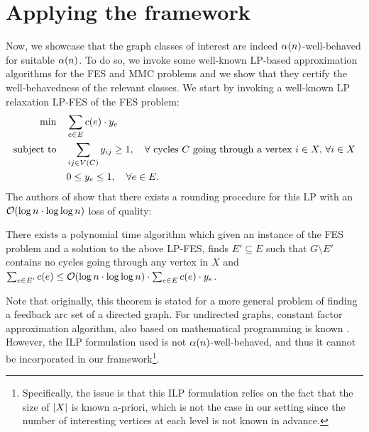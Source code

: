 \section{Applying the framework}\label{sec:applying-framework}

Now, we showcase that the graph classes of interest are indeed $\alpha\mathopen{}\left( n \right)$-well-behaved for suitable $\alpha\mathopen{}\left( n \right)$. To do so, we invoke some well-known LP-based approximation algorithms for the \textsc{FES} and \textsc{MMC} problems and we show that they certify the well-behavedness of the relevant classes. 
We start by invoking a well-known \textsc{LP} relaxation \textsc{LP-FES} of the \textsc{FES} problem:
    \begin{align}
        \min \quad &\sum_{e\in E} c\mathopen{}\left( e \right) \cdot y_{e}\\
        \text{subject to} \quad &\sum_{ij\in V\mathopen{}\left( C \right)} y_{ij} \geq 1, \quad \forall \text{ cycles } C \text{ going through a vertex } i\in X,\,\forall i\in X\\
        &0\leq y_{e} \leq 1, \quad \forall e\in E.
    \end{align}
    The authors of \cite{ApproximatingMinimumFeedbackSetsAndMulticutsInDirectedGraphs} show that there exists a rounding procedure for this \textsc{LP} with an $\mathcal{O}\mathopen{}\left( \log n\cdot\log\log n \right)$ loss of quality:
    \begin{theorem}\label{thm:fes-rounding}
        There exists a polynomial time algorithm which given an instance of the \textsc{FES} problem and a solution to the above \textsc{LP-FES}, finds $E'\subseteq E$ such that $G\setminus E'$ contains no cycles going through any vertex in $X$ and $\sum_{e\in E'} c\mathopen{}\left( e \right) \leq \mathcal{O}\mathopen{}\left( \log n \cdot \log\log n \right)\cdot \sum_{e\in E} c\mathopen{}\left( e \right) \cdot y_{e}$.
    \end{theorem}

    Note that originally, this theorem is stated for a more general problem of finding a feedback arc set of a directed graph. For undirected graphs, constant factor approximation algorithm, also based on mathematical programming is known \cite{ConstantFactorApproximationForSubsetFeedbackSetProblemsViaANewLPRelaxation}. However, the ILP formulation used is not $\alpha\mathopen{}\left( n \right)$-well-behaved, and thus it cannot be incorporated in our framework\footnote{Specifically, the issue is that this ILP formulation relies on the fact that the size of $\mathopen{}\left| X \right|$ is known a-priori, which is not the case in our setting since the number of interesting vertices at each level is not known in advance.}.

